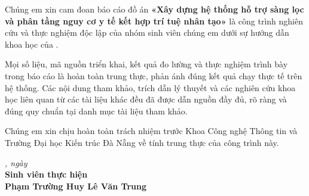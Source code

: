 \begin{declaration}
Chúng em xin cam đoan báo cáo đồ án \textbf{«Xây dựng hệ thống hỗ trợ sàng lọc và phân tầng nguy cơ y tế kết hợp trí tuệ nhân tạo»} là công trình nghiên cứu và thực nghiệm độc lập của nhóm sinh viên chúng em dưới sự hướng dẫn khoa học của \textbf{\dauGVHD}.

Mọi số liệu, mã nguồn triển khai, kết quả đo lường và thực nghiệm trình bày trong báo cáo là hoàn toàn trung thực, phản ánh đúng kết quả chạy thực tế trên hệ thống. Các nội dung tham khảo, trích dẫn lý thuyết và các nghiên cứu khoa học liên quan từ các tài liệu khác đều đã được dẫn nguồn đầy đủ, rõ ràng và đúng quy chuẩn tại danh mục tài liệu tham khảo.

Chúng em xin chịu hoàn toàn trách nhiệm trước Khoa Công nghệ Thông tin và Trường Đại học Kiến trúc Đà Nẵng về tính trung thực của công trình này.

\vspace{1.5cm}
\begin{flushright}
  \begin{minipage}[t]{10cm}
    \centering
    \textit{\dauNoi, ngày \ngaynop}\\[6pt]
    \textbf{Sinh viên thực hiện}\\[1.2cm]
    \textbf{Phạm Trường Huy \qquad Lê Văn Trung}
  \end{minipage}
\end{flushright}
\end{declaration}

